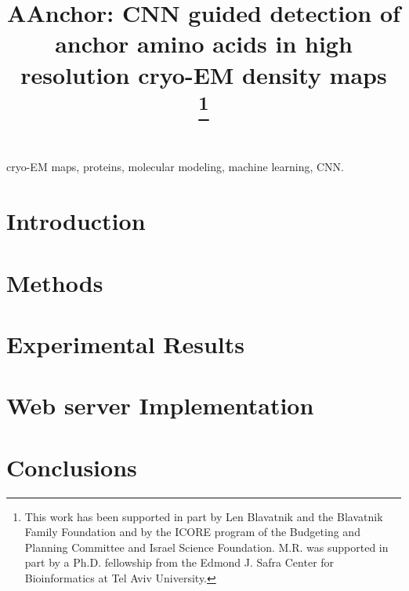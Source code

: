 \documentclass[conference]{IEEEtran}
\begin{document}
\title{AAnchor: CNN guided detection of anchor amino acids in high resolution cryo-EM density maps \\
\thanks{This work has been supported in part by Len Blavatnik and the Blavatnik
Family Foundation and by the ICORE program of the Budgeting and Planning
Committee and Israel Science Foundation. M.R. was supported in part by a Ph.D. fellowship from the Edmond J. Safra Center for Bioinformatics at Tel Aviv University.}
}
\author{
\and
{}
}
\newpage
\maketitle
{}



\begin{abstract}

\end{abstract}

\begin{IEEEkeywords}
cryo-EM maps, proteins, molecular modeling, machine learning, CNN.
\end{IEEEkeywords}
\section{Introduction}

\section{Methods}

\section{Experimental Results}

\section{Web server Implementation}

\section{Conclusions}


\end{document}
